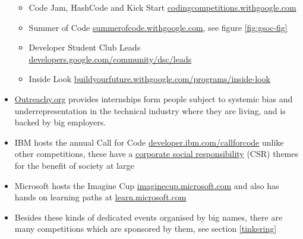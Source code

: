 \documentclass[
]{book}
\providecommand{\tightlist}{%
  \setlength{\itemsep}{0pt}\setlength{\parskip}{0pt}}
\begin{document}
\begin{itemize}
  \begin{itemize}
  \tightlist
  \item
    Code Jam, HashCode and Kick Start \href{https://codingcompetitions.withgoogle.com/}{codingcompetitions.withgoogle.com}
  \item
    Summer of Code \href{https://summerofcode.withgoogle.com/}{summerofcode.withgoogle.com}, see figure \ref{fig:gsoc-fig} \citep{gsoc}
  \item
    Developer Student Club Leads \href{https://developers.google.com/community/dsc/leads}{developers.google.com/community/dsc/leads}
  \item
    Inside Look \href{https://buildyourfuture.withgoogle.com/programs/inside-look/}{buildyourfuture.withgoogle.com/programs/inside-look}
  \end{itemize}
\item
  \href{https://www.outreachy.org/}{Outreachy.org} provides internships form people subject to systemic bias and underrepresentation in the technical industry where they are living, and is backed by big employers.
\item
  IBM hosts the annual Call for Code \href{https://developer.ibm.com/callforcode}{developer.ibm.com/callforcode} unlike other competitions, these have a \href{https://en.wikipedia.org/wiki/Corporate_social_responsibility}{corporate social responsibility} (CSR) themes for the benefit of society at large
\item
  Microsoft hosts the Imagine Cup \href{https://imaginecup.microsoft.com/}{imaginecup.microsoft.com} and also has hands on learning paths at \href{https://learn.microsoft.com/}{learn.microsoft.com}
\item
  Besides these kinds of dedicated events organised by big names, there are many competitions which are sponsored by them, see section \ref{tinkering}
\end{itemize}
\end{document}
